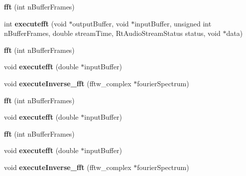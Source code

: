 \begin{DoxyCompactItemize}
\item 
\hypertarget{classfft_a5fff94ac07119207ddd05f628be5891d}{{\bfseries fft} (int n\-Buffer\-Frames)}\label{classfft_a5fff94ac07119207ddd05f628be5891d}

\item 
\hypertarget{classfft_adc64c7e4f7bf74e0c98477043a94608e}{int {\bfseries executefft} (void $\ast$output\-Buffer, void $\ast$input\-Buffer, unsigned int n\-Buffer\-Frames, double stream\-Time, Rt\-Audio\-Stream\-Status status, void $\ast$data)}\label{classfft_adc64c7e4f7bf74e0c98477043a94608e}

\item 
\hypertarget{classfft_a5fff94ac07119207ddd05f628be5891d}{{\bfseries fft} (int n\-Buffer\-Frames)}\label{classfft_a5fff94ac07119207ddd05f628be5891d}

\item 
\hypertarget{classfft_a47e58fd4f715ad89a6fad8df9d715bf4}{void {\bfseries executefft} (double $\ast$input\-Buffer)}\label{classfft_a47e58fd4f715ad89a6fad8df9d715bf4}

\item 
\hypertarget{classfft_a228bd861564c189cd7b6800c950a1c09}{void {\bfseries execute\-Inverse\-\_\-fft} (fftw\-\_\-complex $\ast$fourier\-Spectrum)}\label{classfft_a228bd861564c189cd7b6800c950a1c09}

\item 
\hypertarget{classfft_a5fff94ac07119207ddd05f628be5891d}{{\bfseries fft} (int n\-Buffer\-Frames)}\label{classfft_a5fff94ac07119207ddd05f628be5891d}

\item 
\hypertarget{classfft_a47e58fd4f715ad89a6fad8df9d715bf4}{void {\bfseries executefft} (double $\ast$input\-Buffer)}\label{classfft_a47e58fd4f715ad89a6fad8df9d715bf4}

\item 
\hypertarget{classfft_a5fff94ac07119207ddd05f628be5891d}{{\bfseries fft} (int n\-Buffer\-Frames)}\label{classfft_a5fff94ac07119207ddd05f628be5891d}

\item 
\hypertarget{classfft_a47e58fd4f715ad89a6fad8df9d715bf4}{void {\bfseries executefft} (double $\ast$input\-Buffer)}\label{classfft_a47e58fd4f715ad89a6fad8df9d715bf4}

\item 
\hypertarget{classfft_a228bd861564c189cd7b6800c950a1c09}{void {\bfseries execute\-Inverse\-\_\-fft} (fftw\-\_\-complex $\ast$fourier\-Spectrum)}\label{classfft_a228bd861564c189cd7b6800c950a1c09}


\end{DoxyCompactItemize}
